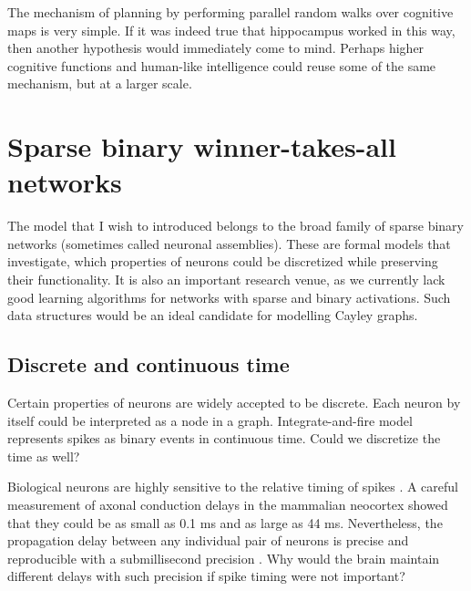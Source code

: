 \documentclass[oneside,english,logo]{amuthesis}
\begin{document}
The mechanism of planning by performing parallel random walks over cognitive maps is very simple. If it was indeed true that hippocampus worked in this way, then another hypothesis would immediately come to mind. Perhaps higher cognitive functions and human-like intelligence could reuse some of the same mechanism, but at a larger scale. 


\chapter{Sparse binary winner-takes-all networks}

The model that I wish to introduced belongs to the broad family of sparse binary networks (sometimes called neuronal assemblies). These are formal models that investigate, which properties of neurons could be discretized while preserving their functionality. It is also an important research venue, as we currently lack good learning algorithms for networks with sparse and binary activations. Such data structures would be an ideal candidate for modelling Cayley graphs. 

\section{Discrete and continuous time}

Certain properties of neurons are widely accepted to be discrete. Each neuron by itself could be interpreted as a node in a graph. Integrate-and-fire model represents spikes as binary events in continuous time. Could we discretize the time as well?

Biological neurons are highly sensitive to the relative timing of spikes \cite{lindsey,prut,villa,tetko}. A careful measurement of axonal conduction delays in the
mammalian neocortex \cite{Swadlow1985,Swadlow1988,Swadlow1992} showed that they could
be as small as 0.1 ms and as large as 44 ms. Nevertheless, the propagation delay
between any individual pair of neurons is precise and reproducible with a
submillisecond precision \cite{Swadlow1985,Swadlow1994}. Why would
the brain maintain different delays with such precision if spike timing were
not important? 
\end{document}
